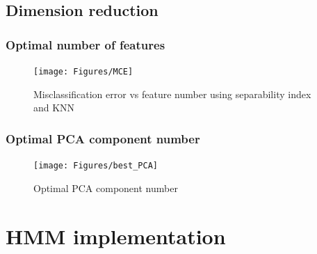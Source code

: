 \subsection{Dimension reduction}
\subsubsection{Optimal number of features}

\begin{figure}[ht!]
	\texttt{[image: Figures/MCE]}
	\caption{Misclassification error vs feature number using separability index and KNN}
	\label{fig:opt-dim}
\end{figure}

\subsubsection{Optimal PCA component number}
\begin{figure}[ht!]
	\texttt{[image: Figures/best\_PCA]}
	\caption{Optimal PCA component number}
	\label{fig:opt-pca}
\end{figure}

\section{HMM implementation}